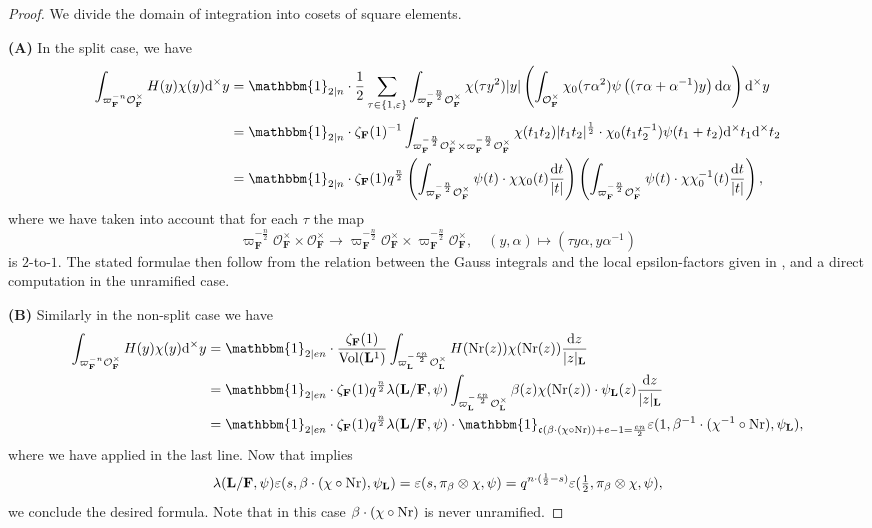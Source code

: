 \documentclass[A4]{amsart}
\numberwithin{equation}{section} \everymath{\displaystyle}
\newcommand{\Nr}{{\rm Nr}}
\newcommand{\id}{\mathbbm{1}}
\newcommand{\ud}{\mathrm{d}}
\newcommand{\F}{\mathbf{F}}
\newcommand{\bL}{\mathbf{L}}
\newcommand{\vO}{\mathcal{O}}
\newcommand{\norm}[1][\cdot]{\lvert #1 \rvert}
\newcommand{\cond}{\mathfrak{c}}
\newcommand{\Vol}{{\rm Vol}}
\begin{document}
\begin{proof}
	We divide the domain of integration into cosets of square elements. 

\noindent \textbf{(A)} In the split case, we have
\begin{align*}
	\int_{\varpi_{\F}^{-n} \vO_{\F}^{\times}} H(y) \chi(y) \ud^{\times} y &= \id_{2 \mid n} \cdot \frac{1}{2} \sum_{\tau \in \{ 1, \varepsilon \}} \int_{\varpi_{\F}^{-\frac{n}{2}} \vO_{\F}^{\times}} \chi(\tau y^2) \norm[y] \left( \int_{\vO_{\F}^{\times}} \chi_0(\tau \alpha^2) \psi \left( (\tau \alpha + \alpha^{-1}) y \right) \ud \alpha \right) \ud^{\times} y \\
	&= \id_{2 \mid n} \cdot \zeta_{\F}(1)^{-1} \int_{\varpi_{\F}^{-\frac{n}{2}} \vO_{\F}^{\times} \times \varpi_{\F}^{-\frac{n}{2}} \vO_{\F}^{\times}} \chi(t_1t_2) \norm[t_1t_2]^{\frac{1}{2}} \cdot \chi_0(t_1t_2^{-1}) \psi(t_1+t_2) \ud^{\times}t_1 \ud^{\times}t_2 \\
	&= \id_{2 \mid n} \cdot \zeta_{\F}(1) q^{\frac{n}{2}} \left( \int_{\varpi_{\F}^{-\frac{n}{2}} \vO_{\F}^{\times}} \psi(t) \cdot \chi \chi_0(t) \frac{\ud t}{\norm[t]} \right) \left( \int_{\varpi_{\F}^{-\frac{n}{2}} \vO_{\F}^{\times}} \psi(t) \cdot \chi \chi_0^{-1}(t) \frac{\ud t}{\norm[t]} \right),
\end{align*}
	where we have taken into account that for each $\tau$ the map
	$$ \varpi_{\F}^{-\frac{n}{2}} \vO_{\F}^{\times} \times \vO_{\F}^{\times} \to \varpi_{\F}^{-\frac{n}{2}} \vO_{\F}^{\times} \times \varpi_{\F}^{-\frac{n}{2}} \vO_{\F}^{\times}, \quad (y,\alpha) \mapsto (\tau y \alpha, y \alpha^{-1}) $$
	is $2$-to-$1$. The stated formulae then follow from the relation between the Gauss integrals and the local epsilon-factors given in \cite[Exercise 23.5]{BuH06}, and a direct computation in the unramified case. 
		
\noindent \textbf{(B)} Similarly in the non-split case we have
\begin{align*}
	\int_{\varpi_{\F}^{-n}\vO_{\F}^{\times}} H(y) \chi(y) \ud^{\times}y &= \id_{2 \mid en} \cdot \frac{\zeta_{\F}(1)}{\Vol(\bL^1)} \int_{\varpi_{\bL}^{-\frac{en}{2}}\vO_{\bL}^{\times}} H(\Nr(z)) \chi(\Nr(z)) \frac{\ud z}{\norm[z]_{\bL}} \\
	&= \id_{2 \mid en} \cdot \zeta_{\F}(1) q^{\frac{n}{2}} \lambda(\bL/\F,\psi) \int_{\varpi_{\bL}^{-\frac{en}{2}}\vO_{\bL}^{\times}} \beta(z) \chi(\Nr(z)) \cdot \psi_{\bL}(z) \frac{\ud z}{\norm[z]_{\bL}} \\
	&= \id_{2 \mid en} \cdot \zeta_{\F}(1) q^{\frac{n}{2}} \lambda(\bL/\F,\psi) \cdot \id_{\cond \left( \beta \cdot (\chi \circ \Nr) \right) + e-1 = \frac{en}{2}} \varepsilon(1, \beta^{-1} \cdot (\chi^{-1} \circ \Nr), \psi_{\bL}),
\end{align*}	
	where we have applied \cite[Exercise 23.5]{BuH06} in the last line. Now that \cite[Theorem 4.7]{JL70} implies
	$$ \lambda(\bL/\F,\psi) \varepsilon(s, \beta \cdot (\chi \circ \Nr), \psi_{\bL}) = \varepsilon(s, \pi_{\beta} \otimes \chi, \psi) = q^{n \cdot (\frac{1}{2}-s)} \varepsilon(\tfrac{1}{2}, \pi_{\beta} \otimes \chi, \psi), $$
	we conclude the desired formula. Note that in this case $\beta \cdot (\chi \circ \Nr)$ is never unramified.
\end{proof}
\end{document}
